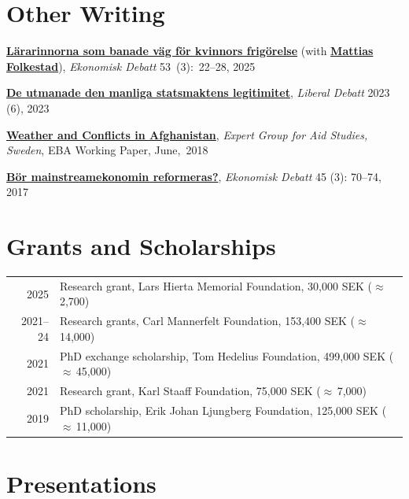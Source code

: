 \documentclass[a4paper]{article}
\makeatletter
\newenvironment{cvtabular}
  {\begin{tabular}{@{}D@{\hspace{6pt}}Y@{}}}
  {\end{tabular}}
\makeatother
\begin{document}
\section*{Other Writing}

{\raggedright
\textbf{\href{https://www.monirbounadi.com/assets/other_writing/Bounadi_2025.pdf}{L\"{a}rarinnorna som banade v\"{a}g f\"{o}r kvinnors frig\"{o}relse}} (with \href{https://mattiasfolkestad.com/}{\textbf{Mattias Folkestad}}), \textit{Ekonomisk Debatt} 53~(3):~22--28, 2025\par
\smallskip
\textbf{\href{https://www.liberaldebatt.se/2023/12/de-utmanade-den-manliga-statsmaktens-legitimitet/}{De utmanade den manliga statsmaktens legitimitet}}, \textit{Liberal Debatt} 2023 (6), 2023\par
\smallskip
\textbf{\href{https://www.monirbounadi.com/assets/other_writing/Bounadi_2018.pdf}{Weather and Conflicts in Afghanistan}}, \textit{Expert Group for Aid Studies, Sweden}, EBA Working Paper, June,~2018\par
\smallskip
\textbf{\href{https://www.monirbounadi.com/assets/other_writing/Bounadi_2017.pdf}{B\"{o}r mainstreamekonomin reformeras?}}, \textit{Ekonomisk Debatt} 45 (3): 70--74, 2017\par
}

\section*{Grants and Scholarships}

\begin{cvtabular}
2025 & Research grant, Lars Hierta Memorial Foundation, 30,000 SEK ($\approx$\,\texteuro{}2,700) \\
2021--24 & Research grants, Carl Mannerfelt Foundation, 153,400 SEK ($\approx$\,\texteuro{}14,000) \\
2021 & PhD exchange scholarship, Tom Hedelius Foundation, 499,000 SEK ($\approx$\,\texteuro{}45,000) \\
2021 & Research grant, Karl Staaff Foundation, 75,000 SEK ($\approx$\,\texteuro{}7,000) \\
2019 & PhD scholarship, Erik Johan Ljungberg Foundation, 125,000 SEK ($\approx$\,\texteuro{}11,000)
\end{cvtabular}

\enlargethispage{\baselineskip}
\section*{Presentations}
\end{document}
